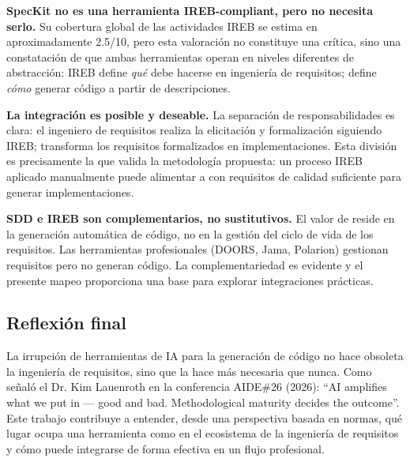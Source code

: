 \textbf{SpecKit no es una herramienta IREB-compliant, pero no necesita serlo.} Su cobertura global de las actividades IREB se estima en aproximadamente 2.5/10, pero esta valoraci\'on no constituye una cr\'itica, sino una constataci\'on de que ambas herramientas operan en niveles diferentes de abstracci\'on: IREB define \emph{qu\'e} debe hacerse en ingenier\'ia de requisitos; \speckit{} define \emph{c\'omo} generar c\'odigo a partir de descripciones.

\textbf{La integraci\'on es posible y deseable.} La separaci\'on de responsabilidades es clara: el ingeniero de requisitos realiza la elicitaci\'on y formalizaci\'on siguiendo IREB; \speckit{} transforma los requisitos formalizados en implementaciones. Esta divisi\'on es precisamente la que valida la metodolog\'ia propuesta: un proceso IREB aplicado manualmente puede alimentar a \speckit{} con requisitos de calidad suficiente para generar implementaciones.

\textbf{SDD e IREB son complementarios, no sustitutivos.} El valor de \speckit{} reside en la generaci\'on autom\'atica de c\'odigo, no en la gesti\'on del ciclo de vida de los requisitos. Las herramientas profesionales (DOORS, Jama, Polarion) gestionan requisitos pero no generan c\'odigo. La complementariedad es evidente y el presente mapeo proporciona una base para explorar integraciones pr\'acticas.

\subsection{Reflexi\'on final}

La irrupci\'on de herramientas de IA para la generaci\'on de c\'odigo no hace obsoleta la ingenier\'ia de requisitos, sino que la hace m\'as necesaria que nunca. Como se\~nal\'o el Dr. Kim Lauenroth en la conferencia AIDE\#26 (2026): ``AI amplifies what we put in --- good and bad. Methodological maturity decides the outcome''. Este trabajo contribuye a entender, desde una perspectiva basada en normas, qu\'e lugar ocupa una herramienta como \speckit{} en el ecosistema de la ingenier\'ia de requisitos y c\'omo puede integrarse de forma efectiva en un flujo profesional.
